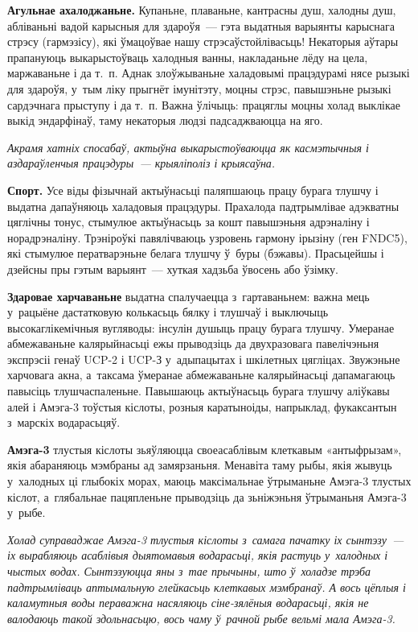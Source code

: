 \textbf{Агульнае ахалоджаньне.} Купаньне, плаваньне, кантрасны душ, халодны душ, абліваньні вадой карысныя для здароўя~--- гэта выдатныя варыянты карыснага стрэсу (гармэзісу), які ўмацоўвае нашу стрэсаўстойлівасьць! Некаторыя аўтары прапануюць выкарыстоўваць халодныя ванны, накладаньне лёду на цела, маржаваньне і да т.~п. Аднак злоўжываньне халадовымі працэдурамі нясе рызыкі для здароўя, у~тым ліку прыгнёт імунітэту, моцны стрэс, павышэньне рызыкі сардэчнага прыступу і да т.~п. Важна ўлічыць: працяглы моцны холад выклікае выкід эндарфінаў, таму некаторыя людзі падсаджваюцца на яго.

\emph{Акрамя хатніх спосабаў, актыўна выкарыстоўваюцца як касмэтычныя і аздараўленчыя працэдуры~--- крыяліполіз і крыясаўна.}

\textbf{Спорт.} Усе віды фізычнай актыўнасьці паляпшаюць працу бурага тлушчу і выдатна дапаўняюць халадовыя працэдуры. Прахалода падтрымлівае адэкватны цяглічны тонус, стымулюе актыўнасьць за кошт павышэньня адрэналіну і норадрэналіну. Трэніроўкі павялічваюць узровень гармону ірызіну (ген FNDC5), які стымулюе ператварэньне белага тлушчу ў~буры (бэжавы). Прасьцейшы і дзейсны пры гэтым варыянт~--- хуткая хадзьба ўвосень або ўзімку.


\textbf{Здаровае харчаваньне} выдатна спалучаецца з~гартаваньнем: важна мець у~рацыёне дастатковую колькасьць бялку і тлушчаў і выключыць высокаглікемічныя вугляводы: інсулін душыць працу бурага тлушчу. Умеранае абмежаваньне калярыйнасьці ежы прыводзіць да двухразовага павелічэньня экспрэсіі генаў UCP-2 і UCP-З у~адыпацытах і шкілетных цягліцах. Звужэньне харчовага акна, а~таксама ўмеранае абмежаваньне калярыйнасьці дапамагаюць павысіць тлушчаспаленьне. Павышаюць актыўнасьць бурага тлушчу аліўкавы алей і Амэга-3 тоўстыя кіслоты, розныя каратыноіды, напрыклад, фукаксантын з~марскіх водарасьцяў.

\textbf{Амэга-3} тлустыя кіслоты зьяўляюцца своеасаблівым клеткавым «антыфрызам», якія абараняюць мэмбраны ад замярзаньня. Менавіта таму рыбы, якія жывуць у~халодных ці глыбокіх морах, маюць максімальнае ўтрыманьне Амэга-3 тлустых кіслот, а~глябальнае пацяпленьне прыводзіць да зьніжэньня ўтрыманьня Амэга-3 у~рыбе.

\emph{Холад суправаджае Амэга-3 тлустыя кіслоты з~самага пачатку іх сынтэзу~--- іх вырабляюць асаблівыя дыятомавыя водарасьці, якія растуць у~халодных і чыстых водах. Сынтэзуюцца яны з~тае прычыны, што ў~холадзе трэба падтрымліваць аптымальную глейкасьць клеткавых мэмбранаў. А вось цёплыя і каламутныя воды пераважна насяляюць сіне-зялёныя водарасьці, якія не валодаюць такой здольнасьцю, вось чаму ў~рачной рыбе вельмі мала Амэга-3.}


